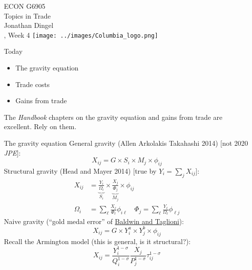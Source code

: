 \documentclass[10pt,notes=hide,aspectratio=169]{beamer}
\begin{document}
\begin{frame}[plain]
\begin{center}
\large
\textcolor{columbiadarkblue}{ECON G6905\\
Topics in Trade\\ 
Jonathan Dingel\\
\semester, Week 4}
\vfill 
\texttt{[image: ../images/Columbia\_logo.png]}
\end{center}
\end{frame}
\begin{frame}{Today}
\begin{itemize}
	\item The gravity equation
	\item Trade costs
	\item Gains from trade
\end{itemize}
The \textit{Handbook} chapters on the gravity equation and gains from trade are excellent.
Rely on them.
\end{frame}
\begin{frame}{The gravity equation}
General gravity (Allen Arkolakis Takahashi 2014) [not 2020 \textit{JPE}]:
\begin{equation*}
X_{ij} = G \times S_i \times M_j \times \phi_{ij}
\end{equation*}
Structural gravity (Head and Mayer 2014) [true by $Y_i = \sum_j X_{ij}$]:
\begin{align*}
X_{ij} &= \underbrace{\frac{Y_i}{\Omega_i}}_{S_i} \times \underbrace{\frac{X_j}{\Phi_j}}_{M_j} \times \phi_{ij}\\
\Omega_i &= \sum_{\ell} \frac{X_{\ell}}{\Phi_{\ell}} \phi_{i \ell}
\quad 
\Phi_j  = \sum_{\ell} \frac{Y_{\ell}}{\Omega_{\ell}} \phi_{\ell j}
\end{align*}
Naive gravity (``gold medal error'' of \href{https://www.nber.org/papers/w12516}{Baldwin and Taglioni}):
\begin{equation*}
X_{ij} = G \times Y_i^a \times Y_j^b \times \phi_{ij}
\end{equation*}
Recall the Armington model (this is general, is it structural?):
\begin{equation*}
X_{ij}	= \frac{Y_i^{1-\sigma}}{Q_i^{1-\sigma}} \frac{X_j}{P_j^{1-\sigma}}\tau_{ij}^{1-\sigma}
\end{equation*}
\end{frame}
\end{document}
